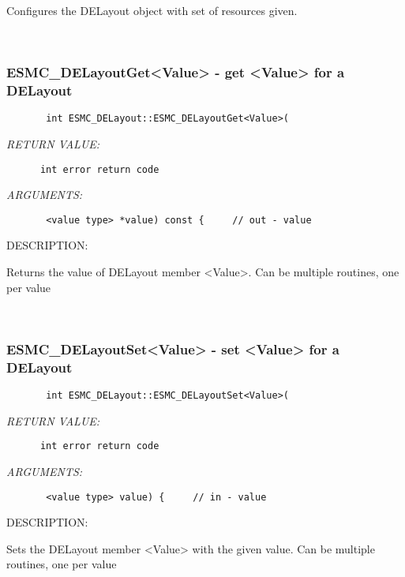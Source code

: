      Configures the DELayout object with set of resources given.
   
 
\mbox{}\hrulefill\ 
 
\subsubsection{ESMC\_DELayoutGet<Value> - get <Value> for a DELayout}


  
\begin{verbatim}       int ESMC_DELayout::ESMC_DELayoutGet<Value>(\end{verbatim}{\em RETURN VALUE:}
\begin{verbatim}      int error return code\end{verbatim}{\em ARGUMENTS:}
\begin{verbatim}       <value type> *value) const {     // out - value\end{verbatim}
{\sf DESCRIPTION:\\ }


       Returns the value of DELayout member <Value>.
       Can be multiple routines, one per value
   
 
\mbox{}\hrulefill\ 
 
\subsubsection{ESMC\_DELayoutSet<Value> - set <Value> for a DELayout}


  
\begin{verbatim}       int ESMC_DELayout::ESMC_DELayoutSet<Value>(\end{verbatim}{\em RETURN VALUE:}
\begin{verbatim}      int error return code\end{verbatim}{\em ARGUMENTS:}
\begin{verbatim}       <value type> value) {     // in - value\end{verbatim}
{\sf DESCRIPTION:\\ }


       Sets the DELayout member <Value> with the given value.
       Can be multiple routines, one per value
   
